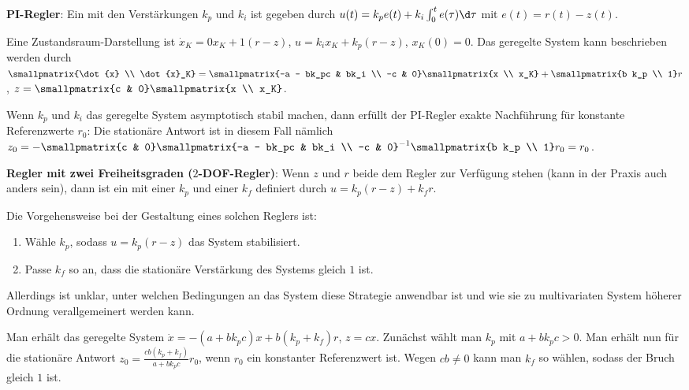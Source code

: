 \linie

\textbf{PI-Regler}:
Ein 
mit den Verstärkungen $k_p$ und $k_i$ ist gegeben durch
$u(t) = k_p e(t) + k_i \int_0^t e(\tau)\d\tau$ mit $e(t) = r(t) - z(t)$.

Eine Zustandsraum-Darstellung ist $\dot{x}_K = 0x_K + 1(r - z)$,
$u = k_i x_K + k_p(r - z)$, $x_K(0) = 0$.
Das geregelte System kann beschrieben werden durch
$\smallpmatrix{\dot{x} \\ \dot{x}_K} = \smallpmatrix{-a - bk_pc & bk_i \\ -c & 0}
\smallpmatrix{x \\ x_K} + \smallpmatrix{b k_p \\ 1} r$,
$z = \smallpmatrix{c & 0} \smallpmatrix{x \\ x_K}$.

Wenn $k_p$ und $k_i$ das geregelte System asymptotisch stabil machen, dann erfüllt der
PI-Regler exakte Nachführung für konstante Referenzwerte $r_0$:
Die stationäre Antwort ist in diesem Fall nämlich
$z_0 = -\smallpmatrix{c & 0} \smallpmatrix{-a - bk_pc & bk_i \\ -c & 0}^{-1}
\smallpmatrix{b k_p \\ 1} r_0 = r_0$.

\linie

\textbf{Regler mit zwei Freiheitsgraden ($2$-DOF-Regler)}:
Wenn $z$ und $r$ beide dem Regler zur Verfügung stehen (kann in der Praxis auch anders sein),
dann ist ein  mit einer
 $k_p$ und einer
 $k_f$ definiert durch
$u = k_p (r - z) + k_f r$.

Die Vorgehensweise bei der Gestaltung eines solchen Reglers ist:
\begin{enumerate}
    \item
    Wähle $k_p$, sodass $u = k_p (r - z)$ das System stabilisiert.
    
    \item
    Passe $k_f$ so an, dass die stationäre Verstärkung des Systems gleich $1$ ist.
\end{enumerate}
Allerdings ist unklar, unter welchen Bedingungen an das System diese Strategie anwendbar ist und
wie sie zu multivariaten System höherer Ordnung verallgemeinert werden kann.

Man erhält das geregelte System $\dot{x} = -(a + bk_p c)x + b (k_p + k_f) r$, $z = cx$.
Zunächst wählt man $k_p$ mit $a + bk_p c > 0$.
Man erhält nun für die stationäre Antwort $z_0 = \frac{cb (k_p + k_f)}{a + bk_p c} r_0$,
wenn $r_0$ ein konstanter Referenzwert ist.
Wegen $cb \not= 0$ kann man $k_f$ so wählen, sodass der Bruch gleich $1$ ist.

